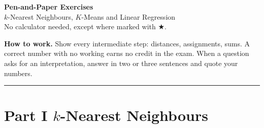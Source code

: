 \documentclass[11pt,a4paper]{article}
\newif\ifsol
\begin{document}
\begin{center}
{\LARGE\bfseries\color{accent} Pen-and-Paper Exercises}\\[4pt]
{\large $k$-Nearest Neighbours, $K$-Means and Linear Regression}\\[4pt]
\ifsol{\large\color{solfr}\bfseries With complete solutions}\else{\normalsize No calculator needed, except where marked with $\bigstar$.}\fi
\end{center}

\noindent\textbf{How to work.} Show every intermediate step: distances, assignments, sums. A correct
number with no working earns no credit in the exam. When a question asks for an interpretation,
answer in two or three sentences and quote your numbers.

\medskip\hrule\medskip

\section*{Part I \quad $k$-Nearest Neighbours}
\end{document}
